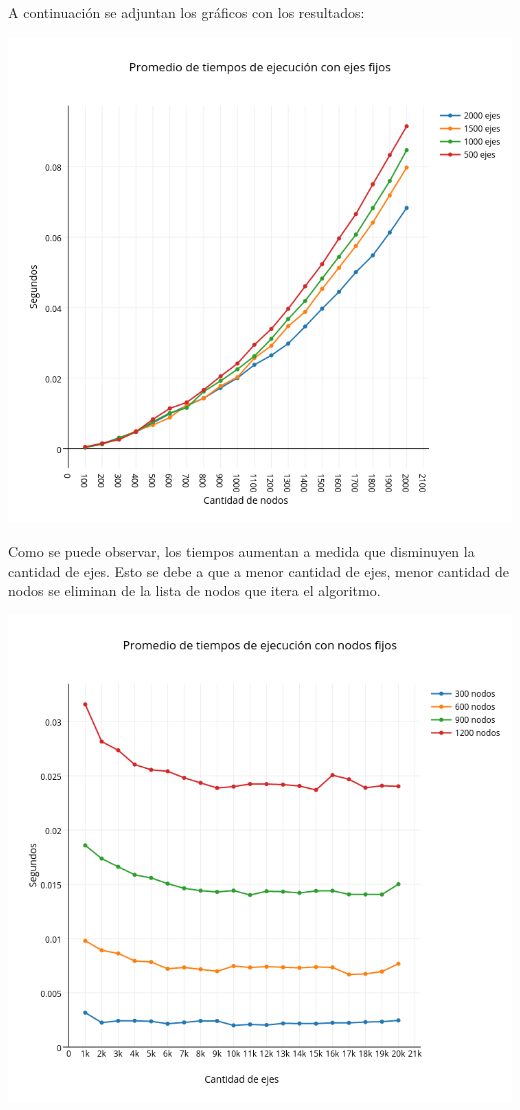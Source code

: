 A continuación se adjuntan los gráficos con los resultados:

\includegraphics[width=15cm,keepaspectratio=yes]{imagenes/greedy/fixedge.png}

Como se puede observar, los tiempos aumentan a medida que disminuyen la cantidad de ejes. Esto se debe a que a menor cantidad de ejes, menor cantidad de nodos se eliminan de la lista de nodos que itera el algoritmo.

\includegraphics[width=15cm,keepaspectratio=yes]{imagenes/greedy/fixnode.png}

